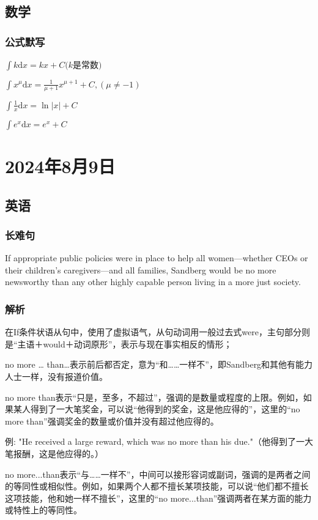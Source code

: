 \documentclass[UTF8]{ctexart}
\begin{document}
\subsection{数学}
\subsubsection{公式默写}
\begin{multicols}{2}
      $\int k\mathrm{d}x=kx+C(k$是常数$)$

      $\int x^\mu \mathrm{d}x=\frac{1}{\mu+1}x^{\mu+1}+C,(\mu\ne-1)$

      $\int\frac{1}{x}\mathrm{d}x=\ln\left | x \right | +C$

      $\int e^x\mathrm{d}x=e^x+C$
\end{multicols}
\section{2024年8月9日}
\subsection{英语}
\subsubsection{长难句}
If appropriate public policies were in place to help all women---whether CEOs or their children's caregivers---and all families, Sandberg would be no more newsworthy than any other highly capable person living in a more just society.
\subsubsection{解析}
在If条件状语从句中，使用了虚拟语气，从句动词用一般过去式were，主句部分则是“主语＋would＋动词原形”，表示与现在事实相反的情形；

no more … than…表示前后都否定，意为“和……一样不”，即Sandberg和其他有能力人士一样，没有报道价值。

no more than表示“只是，至多，不超过”，强调的是数量或程度的上限。例如，如果某人得到了一大笔奖金，可以说“他得到的奖金，这是他应得的”，这里的“no more than”强调奖金的数量或价值并没有超过他应得的。

例: "He received a large reward, which was no more than his due."（他得到了一大笔报酬，这是他应得的。）

no more...than表示“与……一样不”，中间可以接形容词或副词，强调的是两者之间的等同性或相似性。例如，如果两个人都不擅长某项技能，可以说“他们都不擅长这项技能，他和她一样不擅长”，这里的“no more...than”强调两者在某方面的能力或特性上的等同性。
\end{document}
